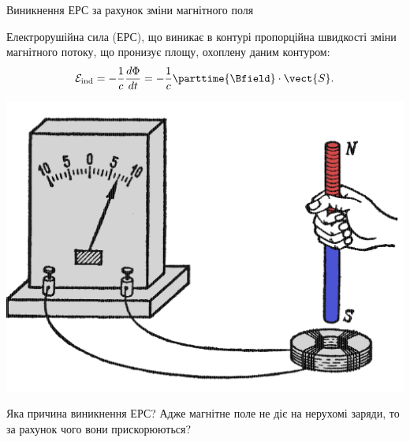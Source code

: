 \documentclass[onlytextwidth]{beamer}
\begin{document}
\begin{frame}{Виникнення ЕРС за рахунок зміни магнітного поля}{}
	\begin{block}{}\justifying
		Електрорушійна сила (ЕРС), що виникає в контурі пропорційна швидкості зміни магнітного потоку, що пронизує площу, охоплену даним контуром:
		\begin{equation*}
			\mathcal{E}_\text{ind} =  -\frac1c \frac{d\Phi}{dt} = -\frac1c \parttime{\Bfield} \cdot \vect{S}.
		\end{equation*}
	\end{block}
	\begin{center}
		\includegraphics[width=0.5\linewidth]{Field_change}
	\end{center}
	\begin{alertblock}{}
		Яка причина виникнення ЕРС? Адже магнітне поле не діє на нерухомі заряди, то за рахунок чого вони прискорюються?
	\end{alertblock}
\end{frame}
\end{document}
